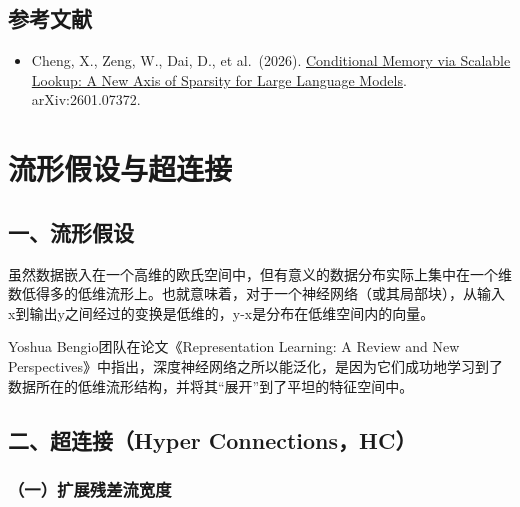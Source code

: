 \hypertarget{ux53c2ux8003ux6587ux732e-100}{%
\subsection{参考文献}\label{ux53c2ux8003ux6587ux732e-100}}

\begin{itemize}
\tightlist
\item
  Cheng, X., Zeng, W., Dai, D., et al.~(2026). \href{https://arxiv.org/abs/2601.07372}{Conditional Memory via Scalable Lookup: A New Axis of Sparsity for Large Language Models}. arXiv:2601.07372.
\end{itemize}

\clearpage

\hypertarget{ux6d41ux5f62ux5047ux8bbeux4e0eux8d85ux8fdeux63a5}{%
\section{流形假设与超连接}\label{ux6d41ux5f62ux5047ux8bbeux4e0eux8d85ux8fdeux63a5}}

\hypertarget{ux4e00ux6d41ux5f62ux5047ux8bbe}{%
\subsection{一、流形假设}\label{ux4e00ux6d41ux5f62ux5047ux8bbe}}

虽然数据嵌入在一个高维的欧氏空间中，但有意义的数据分布实际上集中在一个维数低得多的低维流形上。也就意味着，对于一个神经网络（或其局部块），从输入x到输出y之间经过的变换是低维的，y-x是分布在低维空间内的向量。

Yoshua Bengio团队在论文《Representation Learning: A Review and New Perspectives》中指出，深度神经网络之所以能泛化，是因为它们成功地学习到了数据所在的低维流形结构，并将其``展开''到了平坦的特征空间中。

\hypertarget{ux4e8cux8d85ux8fdeux63a5hyper-connectionshc}{%
\subsection{二、超连接（Hyper Connections，HC）}\label{ux4e8cux8d85ux8fdeux63a5hyper-connectionshc}}

\hypertarget{ux4e00ux6269ux5c55ux6b8bux5deeux6d41ux5bbdux5ea6}{%
\subsubsection{（一）扩展残差流宽度}\label{ux4e00ux6269ux5c55ux6b8bux5deeux6d41ux5bbdux5ea6}}

